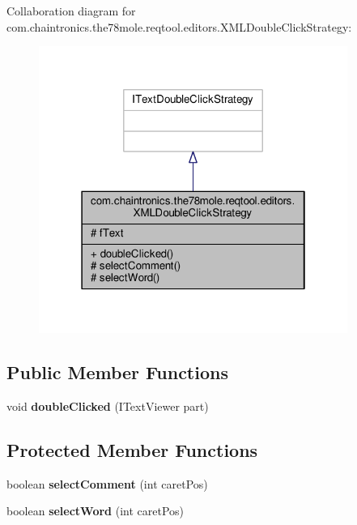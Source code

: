 Collaboration diagram for com.\+chaintronics.\+the78mole.\+reqtool.\+editors.\+X\+M\+L\+Double\+Click\+Strategy\+:\nopagebreak
\begin{figure}[H]
\begin{center}
\leavevmode
\includegraphics[width=286pt]{d6/de8/classcom_1_1chaintronics_1_1the78mole_1_1reqtool_1_1editors_1_1XMLDoubleClickStrategy__coll__graph}
\end{center}
\end{figure}
\subsection*{Public Member Functions}
\begin{DoxyCompactItemize}
\item 
void {\bfseries double\+Clicked} (I\+Text\+Viewer part)\hypertarget{classcom_1_1chaintronics_1_1the78mole_1_1reqtool_1_1editors_1_1XMLDoubleClickStrategy_aafb5075ca8ad6bc4c3f58cef6a4a147e}{}\label{classcom_1_1chaintronics_1_1the78mole_1_1reqtool_1_1editors_1_1XMLDoubleClickStrategy_aafb5075ca8ad6bc4c3f58cef6a4a147e}

\end{DoxyCompactItemize}
\subsection*{Protected Member Functions}
\begin{DoxyCompactItemize}
\item 
boolean {\bfseries select\+Comment} (int caret\+Pos)\hypertarget{classcom_1_1chaintronics_1_1the78mole_1_1reqtool_1_1editors_1_1XMLDoubleClickStrategy_aaddd88f373e37650766ac6b6db87db2b}{}\label{classcom_1_1chaintronics_1_1the78mole_1_1reqtool_1_1editors_1_1XMLDoubleClickStrategy_aaddd88f373e37650766ac6b6db87db2b}

\item 
boolean {\bfseries select\+Word} (int caret\+Pos)\hypertarget{classcom_1_1chaintronics_1_1the78mole_1_1reqtool_1_1editors_1_1XMLDoubleClickStrategy_af29578db7c267c0ce8e3612de04d9fd8}{}\label{classcom_1_1chaintronics_1_1the78mole_1_1reqtool_1_1editors_1_1XMLDoubleClickStrategy_af29578db7c267c0ce8e3612de04d9fd8}

\end{DoxyCompactItemize}
